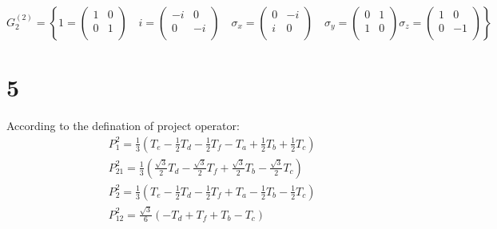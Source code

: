 \documentclass{article}
\begin{document}
\begin{CJK*}{GBK}{song}
\begin{equation}
G_2^{(2)}=\left\{
1=
\begin{pmatrix}
     1  &  0 \\
     0  &  1 \\
\end{pmatrix}\quad
i=
\begin{pmatrix}
     -i  &  0 \\
     0  &  -i \\
\end{pmatrix}\quad
\sigma_x=
\begin{pmatrix}
     0  &  -i \\
     i   &  0 \\
\end{pmatrix}\quad
\sigma_y=
\begin{pmatrix}
     0  &  1 \\
     1  &  0 \\
\end{pmatrix}
\sigma_z=
\begin{pmatrix}
     1  &  0 \\
     0  & -1 \\
\end{pmatrix}
\right\}
\end{equation}


\section{5}
According to the defination of project operator: 
\begin{equation}
\begin{aligned}
&P^2_1=\frac{1}{3}(T_e-\frac{1}{2}T_d-\frac{1}{2}T_f-T_a+\frac{1}{2}T_b+\frac{1}{2}T_c)\\
&P^2_{21}=\frac{1}{3}(\frac{\sqrt{3}}{2}T_d-\frac{\sqrt{3}}{2}T_f+\frac{\sqrt{3}}{2}T_b-\frac{\sqrt{3}}{2}T_c)\\
&P^2_2=\frac{1}{3}(T_e-\frac{1}{2}T_d-\frac{1}{2}T_f+T_a-\frac{1}{2}T_b-\frac{1}{2}T_c)\\
&P^2_{12}=\frac{\sqrt{3}}{6}(-T_d+T_f+T_b-T_c)
\end{aligned}
\end{equation} 







\end{CJK*}
\end{document}
